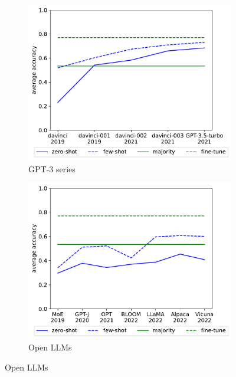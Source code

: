 \documentclass[letterpaper]{article} %
\begin{document}
\begin{figure}[h!]
        \centering
        \begin{subfigure}[b]{0.475\textwidth}
            \centering
            \includegraphics[scale=0.45]{img/output-zero-few-shot-all-dataset.pdf}
            \caption[]%
            {{GPT-3 series}}
            \label{fig:GPT-datasets}
        \end{subfigure}
        \begin{subfigure}[b]{0.475\textwidth}
            \centering
            \includegraphics[scale=0.45]{img/output-zero-few-shot-all-dataset-recent-llm.pdf}
            \caption[]%
            {{Open LLMs}}

\end{subfigure}
\end{figure}
\end{document}
